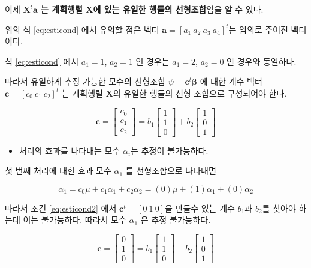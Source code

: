 \documentclass[
]{book}
\makeatletter
\providecommand{\tightlist}{%
  \setlength{\itemsep}{0pt}\setlength{\parskip}{0pt}}
\newenvironment{kframe}{%
\medskip{}
\setlength{\fboxsep}{.8em}
 \def\at@end@of@kframe{}%
 \ifinner\ifhmode%
  \def\at@end@of@kframe{\end{minipage}}%
  \begin{minipage}{\columnwidth}%
 \fi\fi%
 \def\FrameCommand##1{\hskip\@totalleftmargin \hskip-\fboxsep
 \colorbox{shadecolor}{##1}\hskip-\fboxsep
     \hskip-\linewidth \hskip-\@totalleftmargin \hskip\columnwidth}%
 \MakeFramed {\advance\hsize-\width
   \@totalleftmargin\z@ \linewidth\hsize
   \@setminipage}}%
 {\par\unskip\endMakeFramed%
 \at@end@of@kframe}
\newenvironment{rmdblock}[1]
  {
  \begin{itemize}
  \renewcommand{\labelitemi}{
    \raisebox{-.7\height}[0pt][0pt]{
      {\setkeys{Gin}{width=3em,keepaspectratio}\texttt{[image: images/\#1]}}
    }
  }
  \setlength{\fboxsep}{1em}
  \begin{kframe}
  \item
  }
  {
  \end{kframe}
  \end{itemize}
  }
\newenvironment{rmdnote}
  {\begin{rmdblock}{note}}
  {\end{rmdblock}}
\theoremstyle{definition}
\theoremstyle{definition}
\theoremstyle{definition}
\theoremstyle{definition}
\theoremstyle{remark}
\makeatother
\begin{document}
이제 \textbf{\(\bm X^t \bm a\) 는 계획행렬 \(\bm X\)에 있는 유일한 행들의 선형조합}임을 알 수 있다.

\begin{rmdnote}
위의 식 \eqref{eq:esticond} 에서 유의할 점은 벡터 \(\bm a=[a_1 ~a_2~a_3~a_4]^t\)는 임의로 주어진 벡터이다.

식 \eqref{eq:esticond} 에서 \(a_1=1\), \(a_2=1\) 인 경우는 \(a_1=2\), \(a_2=0\) 인 경우와 동일하다.
\end{rmdnote}

따라서 유일하게 추정 가능한 모수의 선형조합 \(\psi = \bm c^t \bm \beta\) 에 대한 계수 벡터 \(\bm c =[ c_0 ~ c_1 ~ c_2]^t\) 는 계획행렬 \(\bm X\)의 유일한 행들의 선형 조합으로 구성되어야 한다.

\begin{equation}
\bm c =
\begin{bmatrix}
c_0 \\
c_1 \\
c_2 
\end{bmatrix}
= 
b_1
\begin{bmatrix}
1 \\
1 \\
0 
\end{bmatrix}
+ 
b_2
\begin{bmatrix}
1 \\
0 \\
1 
\end{bmatrix}
\label{eq:esticond2}
\end{equation}

\begin{itemize}
\tightlist
\item
  처리의 효과를 나타내는 모수 \(\alpha_i\)는 추정이 불가능하다.
\end{itemize}

첫 번째 처리에 대한 효과 모수 \(\alpha_1\) 를 선형조합으로 나타내면

\[ \alpha_1 = c_0 \mu + c_1 \alpha_1 + c_2 \alpha_2 = (0) \mu + (1) \alpha_1 + (0) \alpha_2 \]

따라서 조건 \eqref{eq:esticond2} 에서 \(\bm c^t = [0~1~0]\)을 만들수 있는 계수 \(b_1\)과 \(b_2\)를 찾아야 하는데 이는 불가능하다. 따라서 모수 \(\alpha_1\) 은 추정 불가능하다.

\begin{equation*}
\bm c =
\begin{bmatrix}
0 \\
1 \\
0 
\end{bmatrix}
= 
b_1
\begin{bmatrix}
1 \\
1 \\
0 
\end{bmatrix}
+ 
b_2
\begin{bmatrix}
1 \\
0 \\
1 
\end{bmatrix}
\end{equation*}
\end{document}
